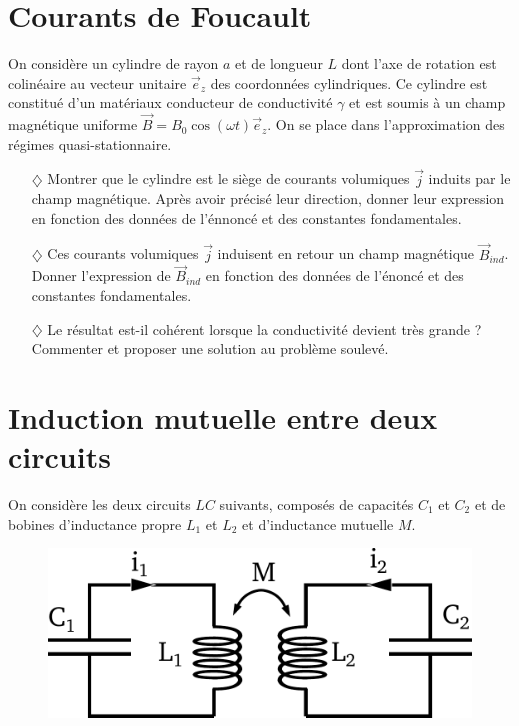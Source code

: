 \documentclass{report}
\begin{document}
\section*{Courants de Foucault}

On considère un cylindre de rayon $a$ et de longueur $L$ dont l'axe de rotation est colinéaire au vecteur unitaire $\vec{e}_z$ des coordonnées cylindriques. Ce cylindre est constitué d'un matériaux conducteur de conductivité $\gamma$ et est soumis à un champ magnétique uniforme $\vec{B}=B_0\cos(\omega t)\vec{e}_z$. On se place dans l'approximation des régimes quasi-stationnaire.

\begin{itemize}

	\item[$\diamondsuit$] Montrer que le cylindre est le siège de courants volumiques $\vec{j}$ induits par le champ magnétique. Après avoir précisé leur direction, donner leur expression en fonction des données de l'énnoncé et des constantes fondamentales.
	
	\item[$\diamondsuit$] Ces courants volumiques $\vec{j}$ induisent en retour un champ magnétique $\vec{B}_{ind}$. Donner l'expression de $\vec{B}_{ind}$ en fonction des données de l'énoncé et des constantes fondamentales.
	
	\item[$\diamondsuit$] Le résultat est-il cohérent lorsque la conductivité devient très grande ? Commenter et proposer une solution au problème soulevé.

\end{itemize}

\newpage

\section*{Induction mutuelle entre deux circuits}
On considère les deux circuits $LC$ suivants, composés de capacités $C_1$ et $C_2$ et de bobines d'inductance propre $L_1$ et $L_2$ et d'inductance mutuelle $M$. 

\begin{figure}[h!]
\centering
		\includegraphics[scale=0.45]{induction_mutuelle.pdf}
\end{figure}
\end{document}
